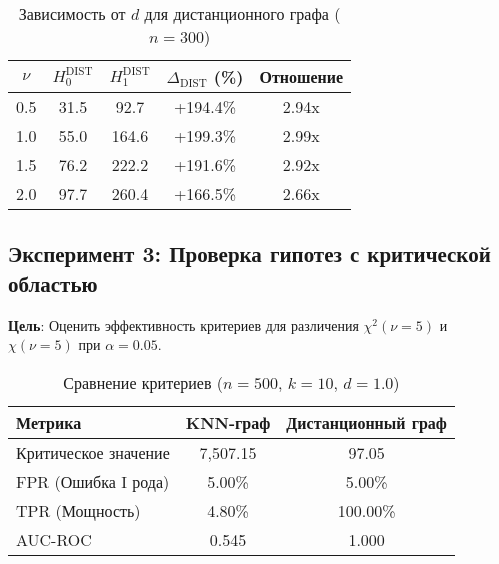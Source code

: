 \documentclass[a4paper, 12pt]{article}
\begin{document}
\begin{table}[H]
    \centering
    \begin{tabular}{|c|c|c|c|c|}
        \hline
        \(\nu\) & \(H_0^{\text{DIST}}\) & \(H_1^{\text{DIST}}\) & \(\Delta_{\text{DIST}}\) (\%) & Отношение \\ \hline
        0.5 & 31.5 & 92.7 & +194.4\% & 2.94x \\ 
        1.0 & 55.0 & 164.6 & +199.3\% & 2.99x \\ 
        1.5 & 76.2 & 222.2 & +191.6\% & 2.92x \\ 
        2.0 & 97.7 & 260.4 & +166.5\% & 2.66x \\ \hline
    \end{tabular}
    \caption{Зависимость от \(d\) для дистанционного графа (\(n=300\))}
    \label{tab:dist_d}
\end{table}

\subsection{Эксперимент 3: Проверка гипотез с критической областью}
\label{exp3}

\textbf{Цель}: Оценить эффективность критериев для различения \(\chi^2(\nu=5)\) и \(\chi(\nu=5)\) при \(\alpha=0.05\).

\begin{table}[H]
    \centering
    \begin{tabular}{|l|c|c|}
        \hline
        \textbf{Метрика} & \textbf{KNN-граф} & \textbf{Дистанционный граф} \\ \hline
        Критическое значение & 7,507.15 & 97.05 \\ 
        FPR (Ошибка I рода) & 5.00\% & 5.00\% \\ 
        TPR (Мощность) & 4.80\% & 100.00\% \\ 
        AUC-ROC & 0.545 & 1.000 \\ \hline
    \end{tabular}
    \caption{Сравнение критериев (\(n=500\), \(k=10\), \(d=1.0\))}
    \label{tab:exp3_results}
\end{table}
\end{document}
